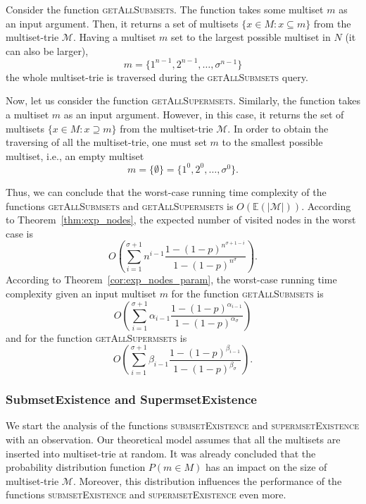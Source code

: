 \documentclass[algorithms,article,accept,pdftex,moreauthors]{Definitions/mdpi}
\begin{document}
Consider the function \textsc{getAllSubmsets}. The function takes some multiset 
$m$ as an input argument. Then, it returns a set of multisets $\{x\in M : x\subseteq m \}$ 
from the multiset-trie $\mathcal{M}$. Having a multiset $m$ set to the largest 
possible multiset in $N$ (it can also be larger), 
\[
m = \{ 1^{n-1},2^{n-1},\ldots, \sigma^{n-1} \}
\]
the whole multiset-trie is traversed during the \textsc{getAllSubmsets} query.

Now, let us consider the function \textsc{getAllSupermsets}. Similarly, the function 
takes a multiset $m$ as an input argument. However, in this case, it returns the 
set of multisets $\{ x\in M : x\supseteq m \}$ from the multiset-trie 
$\mathcal{M}.$ In order to obtain the traversing of all the multiset-trie, one must set 
$m$ to the smallest possible multiset, i.e., an empty multiset
\begin{equation*}
m = \{ \emptyset \} = \{ 1^0,2^0, \ldots, \sigma^0 \}.
\end{equation*}

Thus, we can conclude that the worst-case running time complexity of the 
functions \textsc{getAllSubmsets} and \textsc{getAllSupermsets} is $O(\mathbb{E}( |\mathcal{M}| )).$ 
According to Theorem~\ref{thm:exp_nodes}, the expected number of visited 
nodes in the worst case is 
\begin{equation*}
O(\sum_{i=1}^{\sigma+1} n^{i-1} \frac{1-(1-p)^{n^{\sigma +1 -i}}}{1-(1-p)^{n^{\sigma}}}).
\end{equation*}
According to Theorem~\ref{cor:exp_nodes_param}, the worst-case running 
time complexity given an input multiset $m$ for the function \textsc{getAllSubmsets} is 
\begin{equation*}
O(\sum_{i=1}^{\sigma + 1} \alpha_{i-1} \frac{1-(1-p)^{\alpha_{i-1}}}{1-(1-p)^{\alpha_{\sigma}}})
\end{equation*}
and for the function \textsc{getAllSupermsets} is 
\vspace{6pt} 
\begin{equation*}
O(\sum_{i=1}^{\sigma + 1} \beta_{i-1} \frac{1-(1-p)^{\beta_{i-1}}}{1-(1-p)^{\beta_{\sigma}}}).
\end{equation*}


\subsubsection{SubmsetExistence and SupermsetExistence}\label{ss:exists}
We start the analysis of the functions \textsc{submsetExistence} and 
\textsc{supermsetExistence} with an observation. Our theoretical model assumes 
that all the multisets are inserted into multiset-trie at random. It was already concluded 
that the probability distribution function $P(m\in M)$ has an impact on the size of 
multiset-trie $\mathcal{M}.$ 
Moreover, this distribution influences the performance 
of the functions \textsc{submsetExistence} and \textsc{supermsetExistence} even more. 
\end{document}
